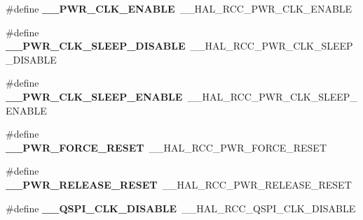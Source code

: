 \begin{DoxyCompactItemize}
\item 
\#define {\bfseries \+\_\+\+\_\+\+P\+W\+R\+\_\+\+C\+L\+K\+\_\+\+E\+N\+A\+B\+LE}~\+\_\+\+\_\+\+H\+A\+L\+\_\+\+R\+C\+C\+\_\+\+P\+W\+R\+\_\+\+C\+L\+K\+\_\+\+E\+N\+A\+B\+LE\hypertarget{group___h_a_l___r_c_c___aliased_gaa17a85c19b592523e867e5ace160d548}{}\label{group___h_a_l___r_c_c___aliased_gaa17a85c19b592523e867e5ace160d548}

\item 
\#define {\bfseries \+\_\+\+\_\+\+P\+W\+R\+\_\+\+C\+L\+K\+\_\+\+S\+L\+E\+E\+P\+\_\+\+D\+I\+S\+A\+B\+LE}~\+\_\+\+\_\+\+H\+A\+L\+\_\+\+R\+C\+C\+\_\+\+P\+W\+R\+\_\+\+C\+L\+K\+\_\+\+S\+L\+E\+E\+P\+\_\+\+D\+I\+S\+A\+B\+LE\hypertarget{group___h_a_l___r_c_c___aliased_ga67d15dd9401936a16ba4fdd94a0c86e3}{}\label{group___h_a_l___r_c_c___aliased_ga67d15dd9401936a16ba4fdd94a0c86e3}

\item 
\#define {\bfseries \+\_\+\+\_\+\+P\+W\+R\+\_\+\+C\+L\+K\+\_\+\+S\+L\+E\+E\+P\+\_\+\+E\+N\+A\+B\+LE}~\+\_\+\+\_\+\+H\+A\+L\+\_\+\+R\+C\+C\+\_\+\+P\+W\+R\+\_\+\+C\+L\+K\+\_\+\+S\+L\+E\+E\+P\+\_\+\+E\+N\+A\+B\+LE\hypertarget{group___h_a_l___r_c_c___aliased_gae4c3fb6253fe1ea5fab7511ab41caae7}{}\label{group___h_a_l___r_c_c___aliased_gae4c3fb6253fe1ea5fab7511ab41caae7}

\item 
\#define {\bfseries \+\_\+\+\_\+\+P\+W\+R\+\_\+\+F\+O\+R\+C\+E\+\_\+\+R\+E\+S\+ET}~\+\_\+\+\_\+\+H\+A\+L\+\_\+\+R\+C\+C\+\_\+\+P\+W\+R\+\_\+\+F\+O\+R\+C\+E\+\_\+\+R\+E\+S\+ET\hypertarget{group___h_a_l___r_c_c___aliased_gaa878da3a908b357042a24fc177d6244d}{}\label{group___h_a_l___r_c_c___aliased_gaa878da3a908b357042a24fc177d6244d}

\item 
\#define {\bfseries \+\_\+\+\_\+\+P\+W\+R\+\_\+\+R\+E\+L\+E\+A\+S\+E\+\_\+\+R\+E\+S\+ET}~\+\_\+\+\_\+\+H\+A\+L\+\_\+\+R\+C\+C\+\_\+\+P\+W\+R\+\_\+\+R\+E\+L\+E\+A\+S\+E\+\_\+\+R\+E\+S\+ET\hypertarget{group___h_a_l___r_c_c___aliased_ga0898b8766cef7eba2878aee8bd444b52}{}\label{group___h_a_l___r_c_c___aliased_ga0898b8766cef7eba2878aee8bd444b52}

\item 
\#define {\bfseries \+\_\+\+\_\+\+Q\+S\+P\+I\+\_\+\+C\+L\+K\+\_\+\+D\+I\+S\+A\+B\+LE}~\+\_\+\+\_\+\+H\+A\+L\+\_\+\+R\+C\+C\+\_\+\+Q\+S\+P\+I\+\_\+\+C\+L\+K\+\_\+\+D\+I\+S\+A\+B\+LE\hypertarget{group___h_a_l___r_c_c___aliased_gade92ff9561e889107d8daba67473989a}{}\label{group___h_a_l___r_c_c___aliased_gade92ff9561e889107d8daba67473989a}


\end{DoxyCompactItemize}
